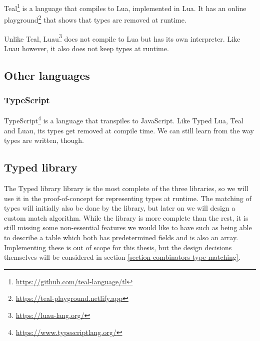 Teal\footnote{\url{https://github.com/teal-language/tl}} is a language that compiles to Lua, implemented in Lua. It has an online playground\footnote{\url{https://teal-playground.netlify.app}} that shows that types are removed at runtime.

Unlike Teal, Luau\footnote{\url{https://luau-lang.org/}} does not compile to Lua but has its own interpreter. Like Luau however, it also does not keep types at runtime.

\subsection{Other languages}
\subsubsection{TypeScript}
TypeScript\footnote{\url{https://www.typescriptlang.org/}} is a language that transpiles to JavaScript. Like Typed Lua, Teal and Luau, its types get removed at compile time. We can still learn from the way types are written, though.

\subsection{Typed library}
The Typed library library is the most complete of the three libraries, so we will use it in the proof-of-concept for representing types at runtime. The matching of types will initially also be done by the library, but later on we will design a custom match algorithm. While the library is more complete than the rest, it is still missing some non-essential features we would like to have such as being able to describe a table which both has predetermined fields and is also an array. Implementing these is out of scope for this thesis, but the design decisions themselves will be considered in section \ref{section-combinators-type-matching}.
